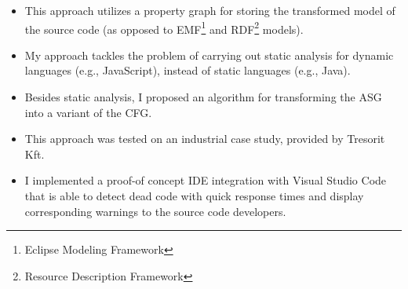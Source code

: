\begin{itemize}[topsep=0pt]
	\item This approach utilizes a property graph for storing the transformed model of the source code (as opposed to EMF\footnote{Eclipse Modeling Framework} and RDF\footnote{Resource Description Framework} models).

	\item My approach tackles the problem of carrying out static analysis for dynamic languages (e.g., JavaScript), instead of static languages (e.g., Java).

	\item Besides static analysis, I proposed an algorithm for transforming the ASG into a variant of the CFG.

	\item This approach was tested on an industrial case study, provided by Tresorit Kft.

	\item I implemented a proof-of concept IDE integration with Visual Studio Code that is able to detect dead code with quick response times and display corresponding warnings to the source code developers.
\end{itemize}
